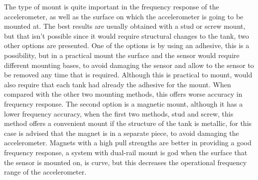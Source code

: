 The type of mount is quite important in the frequency response of the accelerometer, as well as the surface on which the accelerometer is going to be mounted at. The best results are usually obtained with a stud or screw mount, but that isn't possible since it would require structural changes to the tank, two other options are presented. One of the options is by using an adhesive, this is a possibility, but in a practical mount the surface and the sensor would require different mounting bases, to avoid damaging the sensor and allow to the sensor to be removed any time that is required. Although this is practical to mount, would also require that each tank had already the adhesive for the mount. When compared with the other two mounting methods, this offers worse accuracy in frequency response. The second option is a magnetic mount, although it has a lower frequency accuracy, when the first two methods, stud and screw, this method offers a convenient mount if the structure of the tank is metallic, for this case is advised that the magnet is in a separate piece, to avoid damaging the accelerometer. Magnets with a high pull strengths are better in providing a good frequency response, a system with dual-rail mount is god when the surface that the sensor is mounted on, is curve, but this decreases the operational frequency range of the accelerometer.

